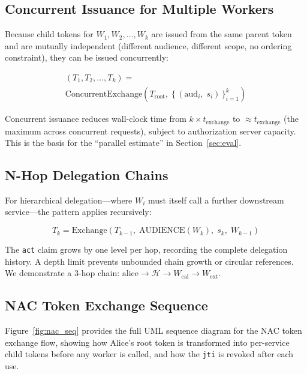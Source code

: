 \documentclass[journal]{IEEEtran}
\begin{document}
\subsection{Concurrent Issuance for Multiple Workers}

Because child tokens for $W_1, W_2, \ldots, W_k$ are issued from the same parent
token and are mutually independent (different audience, different scope, no
ordering constraint), they can be issued concurrently:

\begin{multline}
(T_1, T_2, \ldots, T_k) = \\
\mathrm{ConcurrentExchange}\!\left(
  T_{\mathrm{root}},\;
  \bigl\{\,(\mathrm{aud}_i,\; s_i)\,\bigr\}_{i=1}^{k}
\right)
\label{eq:concurrent}
\end{multline}

Concurrent issuance reduces wall-clock time from $k \times t_{\mathrm{exchange}}$
to $\approx t_{\mathrm{exchange}}$ (the maximum across concurrent requests),
subject to authorization server capacity. This is the basis for the
``parallel estimate'' in Section~\ref{sec:eval}.

\subsection{N-Hop Delegation Chains}

For hierarchical delegation---where $W_i$ must itself call a further downstream
service---the pattern applies recursively:

\begin{equation}
T_k = \mathrm{Exchange}(T_{k-1},\;
  \mathrm{AUDIENCE}(W_k),\; s_k,\; W_{k-1})
\label{eq:nhop}
\end{equation}

The \texttt{act} claim grows by one level per hop, recording the complete
delegation history. A depth limit prevents unbounded chain growth or circular
references. We demonstrate a 3-hop chain:
$\text{alice} \to \mathcal{H} \to W_{\mathrm{cal}} \to W_{\mathrm{ext}}$.

\subsection{NAC Token Exchange Sequence}

Figure~\ref{fig:nac_seq} provides the full UML sequence diagram for the NAC
token exchange flow, showing how Alice's root token is transformed into
per-service child tokens before any worker is called, and how the \texttt{jti}
is revoked after each use.
\end{document}
